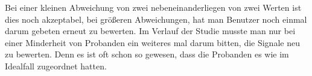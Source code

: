 Bei einer kleinen Abweichung von zwei nebeneinanderliegen von zwei Werten ist dies noch akzeptabel, bei gr{\"o}{\ss}eren Abweichungen, hat man Benutzer noch einmal darum gebeten erneut zu bewerten. Im Verlauf der Studie musste man nur bei einer Minderheit von Probanden ein weiteres mal darum bitten, die Signale neu zu bewerten. Denn es ist oft schon so gewesen, dass die Probanden es wie im Idealfall zugeordnet hatten.

\begin{comment}
Anhand dem Verfahren hat man nur eine grobe Unterteilung, deswegen {\"u}berpr{\"u}ft man, ob diese grobe Absch{\"a}tzung passt.
Zun{\"a}chst bestimmt man f{\"u}r jeden Signaltypen das arithmetische Median, was in diesem Fall 150 f{\"u}r Kurz, 433 f{\"u}r Mittel und 780 f{\"u}r Lang ist.
Da sich die Grenzen vom Minimum von Kurz und das Maximum von Lang nicht {\"a}ndern, sind $Kurz_{Min}$ = 100ms und $Lang_{Max}$ = 1000ms bei jedem Probanden fest definiert und beginnt damit f{\"u}r Kurz und Lang die Grenzen zu bestimmen.
Zuerst berechnet man anhand der groben Absch{\"a}tzung der Grenzen den Mittelwert, dabei ergibt sich $Kurz_{Mit}$ = 150 und $Lang_{Mit}$ = 850.

Wenn das arithmetische Median kleiner als der Mittelwert ist, dann berechnet man bei Kurz ein neues Maximum und bei Lang ein neues Minimum.
Bei Kurz ist dies nicht der Fall, da der Median und Mittelwert beide 150 sind, daher bleibt $Kurz_{Max}$ = 200ms.
Bei Lang tritt dieser Fall ein und daher berechnet anhand der Formel $Lang_{Min} = (2 * Lang_{Med}) - Lang_{Max}$ daraus ergibt sich f{\"u}r $Lang_{Min}$ = 560. 

W{\"u}rden sich die erkannten Signaltypen {\"u}berschneiden, so f{\"a}ngt man an das arithmetische Mittel von Kurz, Mittel und Lang zu bilden; desweiteren werden neue Grenzen bestimmt, indem man von der kleinsten Signall{\"a}nge anf{\"a}ngt und diese dann dem zuwei{\ss}t, was ausgew{\"a}hlt worden ist. Man hat drei mal das Minimum und das Maximum von Kurz, Mittel und Lang, die neu bestimmt werden, dabei wird anhand der folgenden Tabelle gezeigt, wie die neuen Intervalle bestimmt werden.


Da man wei{\ss}, dass das Minimum von Kurz 100ms und das Maximum von Lang 1000ms ist, berechnet man die Intervalle von Kurz und Lang zuerst. Dabei berechnet man den Mittelwert um herauszufinden, ob das arithmetische Mittel identisch mit dem Mittel wert ist. Wenn dies der Fall ist, so sind die Grenzen f{\"u}r den Fall richtig und es muss f{\"u}r den Signaltypen nichts weiter berechnet werden. 

Da man wei{\ss}, dass das Minimum von Kurz 100 ms und das Maximum von Lang 1000ms ist, berechnet man die Differenz zwischen dem  und dem Minimum von Kurz. Diese Differenz auf das Median dazu addiert und {\"u}berpr{\"u}ft, ob 
\end{comment}

